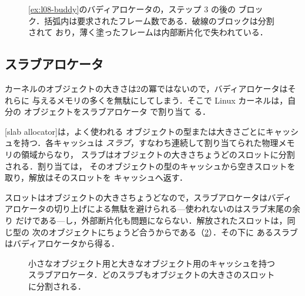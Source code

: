 \documentclass[../main.tex]{subfiles}
\begin{document}
\begin{figure}[bp]
  \centering
  
  \caption{\cref{ex:l08-buddy}のバディアロケータの，ステップ 3 の後の
    ブロック．括弧内は要求されたフレーム数である．破線のブロックは分割されて
    おり，薄く塗ったフレームは内部断片化で失われている．}
  \label{fig:l08-buddy}
\end{figure}

\subsection{スラブアロケータ}

カーネルのオブジェクトの大きさは2の冪ではないので，バディアロケータはそれらに
与えるメモリの多くを無駄にしてしまう．そこで Linux カーネルは，自分の
オブジェクトをスラブアロケータ \cite{bonwick1994} で割り当て
る．

\begin{definition}[スラブアロケータ]
  [slab allocator]は，よく使われる
  オブジェクトの型または大きさごとにキャッシュを持つ．各キャッシュは
  \emph{スラブ}，すなわち連続して割り当てられた物理メモリの領域からなり，
  スラブはオブジェクトの大きさちょうどのスロットに分割される．割り当ては，
  そのオブジェクトの型のキャッシュから空きスロットを取り，解放はそのスロットを
  キャッシュへ返す．
\end{definition}

スロットはオブジェクトの大きさちょうどなので，スラブアロケータはバディ
アロケータの切り上げによる無駄を避けられる---使われないのはスラブ末尾の余り
だけである---し，外部断片化も問題にならない．解放されたスロットは，同じ型の
次のオブジェクトにちょうど合うからである（\cref{fig:l08-slab}）．その下に
あるスラブはバディアロケータから得る．

\begin{figure}[htbp]
  \centering
  
  \caption{小さなオブジェクト用と大きなオブジェクト用のキャッシュを持つ
    スラブアロケータ．どのスラブもオブジェクトの大きさのスロットに分割される．}
  \label{fig:l08-slab}
\end{figure}
\end{document}
